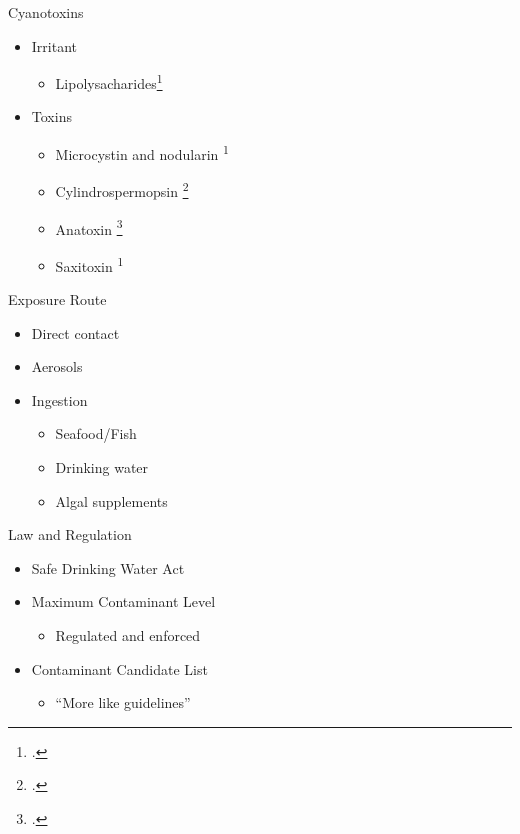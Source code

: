 \begin{frame}{Cyanotoxins}

	\begin{itemize}
		\item Irritant
			\begin{itemize}
				\item Lipolysacharides\footcite{moore_richard_cyanobacterial_1993}
			\end{itemize}
		\item Toxins
			\begin{itemize} 
				\item Microcystin and nodularin \textsuperscript{1}
  				\item Cylindrospermopsin \footcite{dittmann_cyanobacterial_2012}
				\item Anatoxin \footcite{codd_cyanobacterial_1999}
				\item Saxitoxin \textsuperscript{1}
			\end{itemize}
	\end{itemize}

\end{frame}

\begin{frame}{Exposure Route}

	\begin{itemize}
		\item Direct contact
		\item Aerosols
		\item Ingestion
		\begin{itemize}
			\item Seafood/Fish 
			\item Drinking water
			\item Algal supplements
		\end{itemize}
	\end{itemize}

\end{frame}
\begin{frame}{Law and Regulation}

	\begin{itemize}
		\item Safe Drinking Water Act
		\item Maximum Contaminant Level
		\begin{itemize}
			\item Regulated and enforced
		\end{itemize}
		\item Contaminant Candidate List
		\begin{itemize}
			\item ``More like guidelines''
		\end{itemize}
	\end{itemize}
\end{frame}


